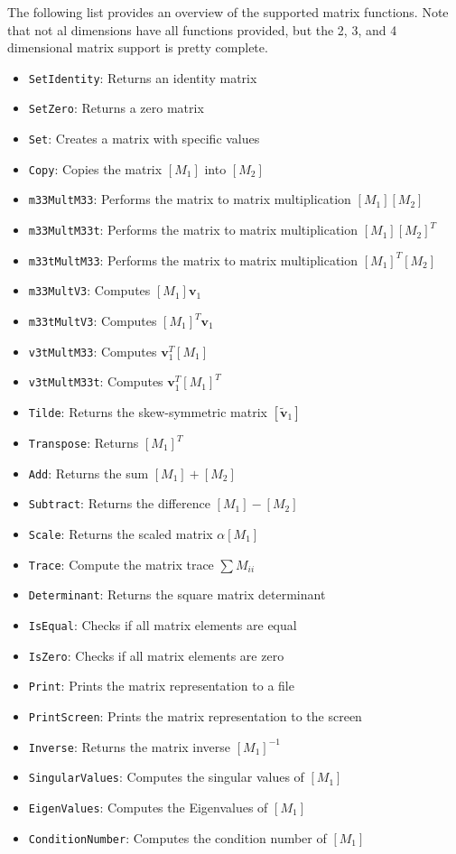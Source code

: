 The following list provides an overview of the supported matrix functions.  Note that not al dimensions have all functions provided, but the 2, 3, and 4 dimensional matrix support is pretty complete.  
\begin{itemize}
	\item {\tt SetIdentity}: Returns an identity matrix
	\item {\tt SetZero}: Returns a zero matrix
	\item {\tt Set}: Creates a matrix with specific values
	\item {\tt Copy}: Copies the matrix $[M_{1}]$ into $[M_{2}]$
	\item {\tt m33MultM33}: Performs the matrix to matrix multiplication $[M_{1}][M_{2}]$
	\item {\tt m33MultM33t}: Performs the matrix to matrix multiplication $[M_{1}][M_{2}]^{T}$
	\item {\tt m33tMultM33}: Performs the matrix to matrix multiplication $[M_{1}]^{T}[M_{2}]$
	\item {\tt m33MultV3}: Computes $[M_{1}]\bm v_{1}$ 
	\item {\tt m33tMultV3}: Computes $[M_{1}]^{T}\bm v_{1}$ 
	\item {\tt v3tMultM33}: Computes $\bm v_{1}^{T}[M_{1}]$ 
	\item {\tt v3tMultM33t}: Computes  $\bm v_{1}^{T}[M_{1}]^{T}$
	\item {\tt Tilde}: Returns the skew-symmetric matrix $[\tilde{\bm v}_{1}]$
	\item {\tt Transpose}: Returns $[M_{1}]^{T}$
	\item {\tt Add}: Returns the sum $[M_{1}] + [M_{2}]$
	\item {\tt Subtract}: Returns the difference $[M_{1}] - [M_{2}]$
	\item {\tt Scale}: Returns the scaled matrix $\alpha [M_{1}]$
	\item {\tt Trace}: Compute the matrix trace $\sum M_{ii}$
	\item {\tt Determinant}: Returns the square matrix determinant
	\item {\tt IsEqual}: Checks if all matrix elements are equal
	\item {\tt IsZero}: Checks if all matrix elements are zero
	\item {\tt Print}: Prints the matrix representation to a file
	\item {\tt PrintScreen}: Prints the matrix representation to the screen
	\item {\tt Inverse}: Returns the matrix inverse $[M_{1}]^{-1}$
	\item {\tt SingularValues}: Computes the singular values of $[M_{1}]$
	\item {\tt EigenValues}: Computes the Eigenvalues of $[M_{1}]$
	\item {\tt ConditionNumber}: Computes the condition number of $[M_{1}]$
\end{itemize}




